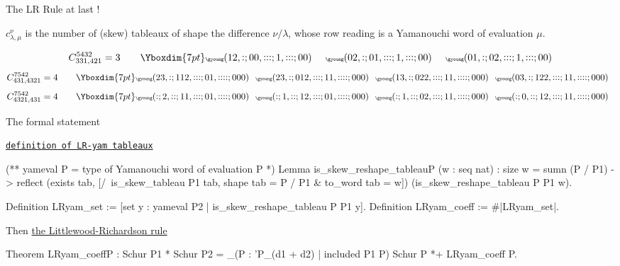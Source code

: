 \documentclass[compress,11pt]{beamer}
\begin{document}
\begin{frame}{The LR Rule at last !}

  \begin{THEO}
    $c_{\lambda, \mu}^{\nu}$ is the number of (skew) tableaux of shape the
    difference $\nu/\lambda$, whose row reading is a Yamanouchi word of
    evaluation $\mu$.
  \end{THEO}
  \[
  C_{331,421}^{5432} = 3
  \qquad \Yboxdim{7pt}\tiny
  \gyoung(12,:;00,:::;1,:::;00)\qquad
  \gyoung(02,:;01,:::;1,:::;00)\qquad
  \gyoung(01,:;02,:::;1,:::;00)
  \]
  \[
  C_{431,4321}^{7542} = 4
  \qquad \Yboxdim{7pt}\tiny
  \gyoung(23,:;112,:::;01,::::;000)\quad
  \gyoung(23,:;012,:::;11,::::;000)\quad
  \gyoung(13,:;022,:::;11,::::;000)\quad
  \gyoung(03,:;122,:::;11,::::;000)\quad
  \]
  \[
  C_{4321,431}^{7542} = 4
  \qquad \Yboxdim{7pt}\tiny
  \gyoung(:;2,::;11,:::;01,::::;000)\quad
  \gyoung(:;1,::;12,:::;01,::::;000)\quad
  \gyoung(:;1,::;02,:::;11,::::;000)\quad
  \gyoung(:;0,::;12,:::;11,::::;000)\quad
  \]

\end{frame}

\begin{frame}[fragile]{The formal statement}

  {\tiny\hfill
    \href{file:html/Combi.LRrule.therule.html#is_skew_reshape_tableau}%
    {\texttt{definition of LR-yam tableaux}}
  \vspace{-2mm}}
\begin{coqcode}
(** yameval P = type of Yamanouchi word of evaluation P *)
Lemma is_skew_reshape_tableauP (w : seq nat) :
  size w = sumn (P / P1) ->
  reflect
    (exists tab, [/\ is_skew_tableau P1 tab,
                     shape tab = P / P1 & to_word tab = w])
    (is_skew_reshape_tableau P P1 w).

Definition LRyam_set :=
  [set y : yameval P2 | is_skew_reshape_tableau P P1 y].
Definition LRyam_coeff := #|LRyam_set|.
\end{coqcode}
Then
  {\tiny\hfill
    \href{file:html/Combi.LRrule.therule.html#LRyam_coeffP}%
    {the Littlewood-Richardson rule}
  \vspace{-2mm}}
\begin{coqcode}
Theorem LRyam_coeffP :
  Schur P1 * Schur P2 =
  \sum_(P : 'P_(d1 + d2) | included P1 P) Schur P *+ LRyam_coeff P.
\end{coqcode} 

\end{frame}
\end{document}
